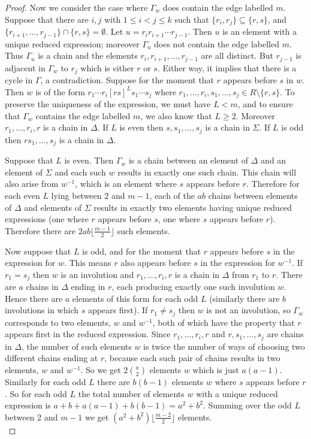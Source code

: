 \documentclass[a4paper,12pt]{article}
\theoremstyle{definition}
\begin{document}
\begin{proof}
Now we consider the case where $\Gamma_w$ does contain the edge labelled $m$. Suppose that there are $i, j$ with $1 \leq i < j \leq k$ such that $\{r_i, r_j\} \subseteq \{r,s\}$, and $\{r_{i+1}, \ldots, r_{j-1}\} \cap \{r, s\} = \emptyset$. Let $u = r_ir_{i+1}\cdots r_{j-1}$. Then $u$ is an element with a unique reduced expression; moreover $\Gamma_u$ does not contain the edge labelled $m$. Thus $\Gamma_u$ is a chain and the elements $r_i,r_{i+1},\ldots, r_{j-1}$ are all distinct. But $r_{j-1}$ is adjacent in $\Gamma_w$ to $r_j$ which is either $r$ or $s$. Either way, it implies that there is a cycle in $\Gamma$, a contradiction. Suppose for the moment that $r$ appears before $s$ in $w$. Then $w$ is of the form $r_1 \cdots r_{i}[rs]^Ls_1 \cdots s_j$ where $r_1, \ldots, r_i, s_1, \ldots, s_j \in R\setminus\{r,s\}$. To preserve the uniqueness of the expression, we must have $L < m$, and to ensure that $\Gamma_w$ contains the edge labelled $m$, we also know that $L \geq 2$. 
Moreover $r_1, \ldots, r_{i}, r$ is a chain in $\Delta$. If $L$ is even then $s, s_1, \ldots, s_j$ is a chain in $\Sigma$. If $L$ is odd then $rs_1, \ldots, s_j$ is a chain in $\Delta$. 

Suppose that $L$ is even. Then $\Gamma_w$ is a chain between an element of $\Delta$ and an element of $\Sigma$ and each such $w$ results in exactly one such chain. This chain will also arise from $w^{-1}$, which is an element where $s$ appears before $r$. Therefore for each even $L$ lying between $2$ and $m-1$, each of the $ab$ chains between elements of $\Delta$ and elements of $\Sigma$ results in exactly two elements having unique reduced expressions (one where $r$ appears before $s$, one where $s$ appears before $r$). Therefore there are $2ab\lfloor\frac{m-1}{2}\rfloor$ such elements. 

Now suppose that $L$ is odd, and for the moment that $r$ appears before $s$ in the expression for $w$. This means $r$ also appears before $s$ in the expression for $w^{-1}$. If $r_1 = s_j$ then $w$ is an involution and $r_1, \ldots, r_i, r$ is a chain in $\Delta$ from $r_1$ to $r$. There are $a$ chains  in $\Delta$ ending in $r$, each producing exactly one such involution $w$. Hence there are $a$ elements of this form for each odd $L$ (similarly there are $b$ involutions in which $s$ appears first). If $r_1 \neq s_j$ then $w$ is not an involution, so $\Gamma_w$ corresponds to two elements, $w$ and $w^{-1}$, both of which have the property that $r$ appears first in the reduced expression. Since $r_1,\ldots, r_i, r$ and $r, s_1, \ldots, s_j$ are chains in $\Delta$, the number of such elements $w$ is twice the number of ways of choosing two different chains ending at $r$, because each such pair of chains results in two elements, $w$ and $w^{-1}$. So we get $2\binom{a}{2}$ elements $w$ which is just $a(a-1)$. Similarly for each odd $L$ there are $b(b-1)$ elements $w$ where $s$ appears before $r$. So for each odd $L$ the total number of elements $w$ with a unique reduced expression is $a + b + a(a-1) + b(b-1) = a^2 + b^2$. Summing over the odd $L$ between 2 and $m-1$ we get $(a^2 + b^2)\lfloor\frac{m-2}{2}\rfloor$ elements. \\


\end{proof}
\end{document}
